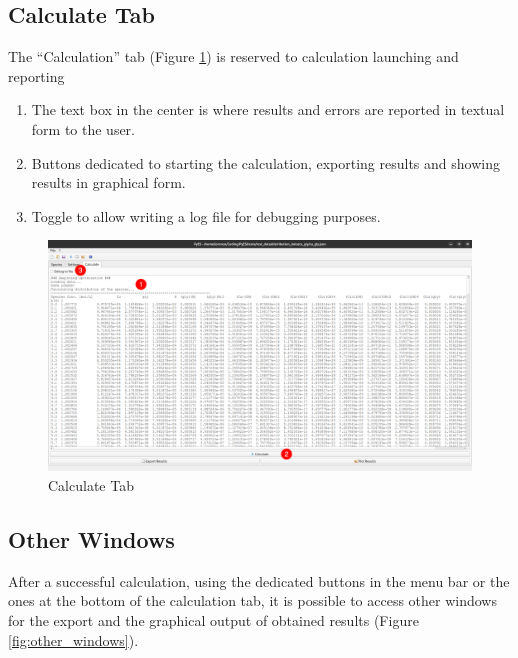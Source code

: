 \documentclass[a4paper, 12pt]{article}
\newcommand*\circled[1]{\kern-2.5em%
  \put(0,4){\color{red}\circle*{18}}\put(0,4){\circle{16}}%
  \put(-4,0){\color{white}\bfseries\large#1}~~}
\begin{document}
\subsection{Calculate Tab}
The ``Calculation'' tab (Figure \ref{fig:calculate}) is reserved to calculation launching and reporting

\begin{enumerate}[label=\protect\circled{\arabic*}]
    \item The text box in the center is where results and errors are reported in textual form to the user.
    \item Buttons dedicated to starting the calculation, exporting results and showing results in graphical form.
    \item Toggle to allow writing a log file for debugging purposes.
\end{enumerate}

\begin{figure}[h]
	\centering
	\includegraphics[width=\textwidth]{img/calculate.png}
	\caption{Calculate Tab}
    \label{fig:calculate}
\end{figure}

\subsection{Other Windows}

After a successful calculation, using the dedicated buttons in the menu bar or the ones at the bottom of the calculation tab, it is possible to access other windows for the export and the graphical output of obtained results (Figure \ref*{fig:other_windows}).
\end{document}
